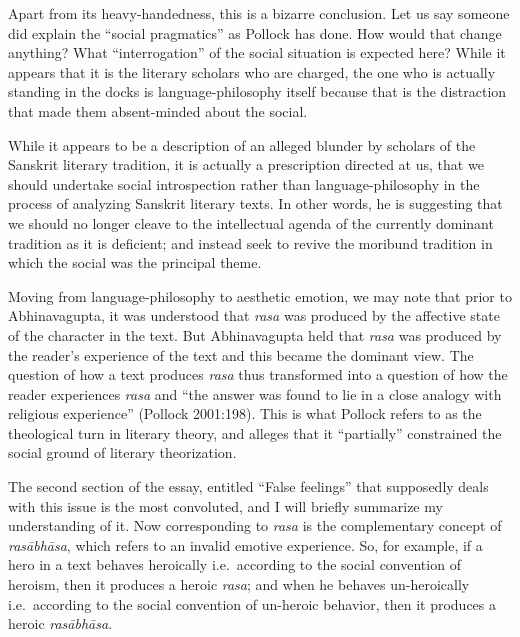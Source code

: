 Apart from its heavy-handedness, this is a bizarre conclusion. Let us say someone did explain the ``social pragmatics'' as Pollock has done. How would that change anything? What ``interrogation'' of the social situation is expected here? While it appears that it is the literary scholars who are charged, the one who is actually standing in the docks is language-philosophy itself because that is the distraction that made them absent-minded about the social. 

While it appears to be a description of an alleged blunder by scholars of the Sanskrit literary tradition, it is actually a prescription directed at us, that we should undertake social introspection rather than language-philosophy in the process of analyzing Sanskrit literary texts. In other words, he is suggesting that we should no longer cleave to the intellectual agenda of the currently dominant tradition as it is deficient; and instead seek to revive the moribund tradition in which the social was the principal theme.

Moving from language-philosophy to aesthetic emotion, we may note that prior to Abhinavagupta, it was understood that \textsl{rasa} was produced by the affective state of the character in the text. But Abhinavagupta held that \textsl{rasa} was produced by the reader's experience of the text and this became the dominant view. The question of how a text produces \textsl{rasa} thus transformed into a question of how the reader experiences \textsl{rasa} and ``the answer was found to lie in a close analogy with religious experience'' (Pollock 2001:198). This is what Pollock refers to as the theological turn in literary theory, and alleges that it ``partially'' constrained the social ground of literary theorization.

The second section of the essay, entitled ``False feelings'' that supposedly deals with this issue is the most convoluted, and I will briefly summarize my understanding of it. Now corresponding to \textsl{rasa} is the complementary concept of \textsl{rasābhāsa}, which refers to an invalid emotive experience. So, for example, if a hero in a text behaves heroically i.e.\ according to the social convention of heroism, then it produces a heroic \textsl{rasa}; and when he behaves un-heroically i.e.\ according to the social convention of un-heroic behavior, then it produces a heroic \textsl{rasābhāsa}. 

